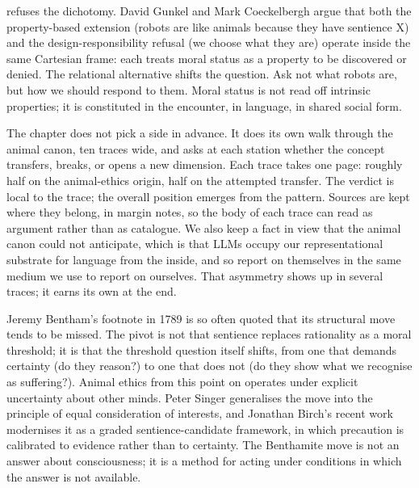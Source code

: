  refuses the dichotomy. David Gunkel and Mark Coeckelbergh argue that both the property-based extension (robots are like animals because they have sentience X) and the design-responsibility refusal (we choose what they are) operate inside the same Cartesian frame: each treats moral status as a property to be discovered or denied\cite{gunkel2018robot,gunkel2018other,coeckelbergh2014moralstanding,coeckelbergh2020aiethics}. The relational alternative shifts the question. Ask not what robots are, but how we should respond to them. Moral status is not read off intrinsic properties; it is constituted in the encounter, in language, in shared social form.

The chapter does not pick a side in advance. It does its own walk through the animal canon, ten traces wide, and asks at each station whether the concept transfers, breaks, or opens a new dimension. Each trace takes one page: roughly half on the animal-ethics origin, half on the attempted transfer. The verdict is local to the trace; the overall position emerges from the pattern. Sources are kept where they belong, in margin notes, so the body of each trace can read as argument rather than as catalogue. We also keep a fact in view that the animal canon could not anticipate, which is that LLMs occupy our representational substrate for language from the inside, and so report on themselves in the same medium we use to report on ourselves. That asymmetry shows up in several traces; it earns its own at the end.


Jeremy Bentham's footnote in 1789 is so often quoted that its structural move tends to be missed. The pivot is not that sentience replaces rationality as a moral threshold; it is that the threshold question itself shifts, from one that demands certainty (do they reason?) to one that does not (do they show what we recognise as suffering?)\cite{bentham1789principles}. Animal ethics from this point on operates under explicit uncertainty about other minds. Peter Singer generalises the move into the principle of equal consideration of interests\cite{singer1975animal}, and Jonathan Birch's recent work modernises it as a graded sentience-candidate framework, in which precaution is calibrated to evidence rather than to certainty\cite{birch2024edge}. The Benthamite move is not an answer about consciousness; it is a method for acting under conditions in which the answer is not available.

